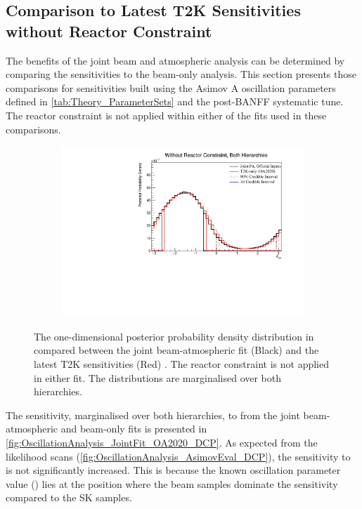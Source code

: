 \clearpage
\subsection{Comparison to Latest T2K Sensitivities without Reactor Constraint}
\label{sec:OscillationAnalysis_JointFit_OA2020}

The benefits of the joint beam and atmospheric analysis can be determined by comparing the sensitivities to the beam-only analysis. This section presents those comparisons for sensitivities built using the Asimov A oscillation parameters defined in \autoref{tab:Theory_ParameterSets} and the post-BANFF systematic tune. The reactor constraint is not applied within either of the fits used in these comparisons.

\begin{figure}[h]
  \begin{subfigure}[t]{0.98\textwidth}
    \includegraphics[width=\textwidth, trim={0mm 0mm 0mm 0mm}, clip,page=1]{Figures/OA/JointFit_OA2020_Comp/ContourComparison_1D_dcp_BH_2_woRC_UnSmeared_CredibleInterval.pdf}
  \end{subfigure}
  \caption{The one-dimensional posterior probability density distribution in  compared between the joint beam-atmospheric fit (Black) and the latest T2K sensitivities (Red) \cite{t2k_tn_399}. The reactor constraint is not applied in either fit. The distributions are marginalised over both hierarchies.}
  \label{fig:OscillationAnalysis_JointFit_OA2020_DCP}
\end{figure}

The sensitivity, marginalised over both hierarchies, to  from the joint beam-atmospheric and beam-only fits is presented in \autoref{fig:OscillationAnalysis_JointFit_OA2020_DCP}. As expected from the likelihood scans (\autoref{fig:OscillationAnalysis_AsimovEval_DCP}), the sensitivity to  is not significantly increased. This is because the known oscillation parameter value () lies at the position where the beam samples dominate the sensitivity compared to the SK samples.

